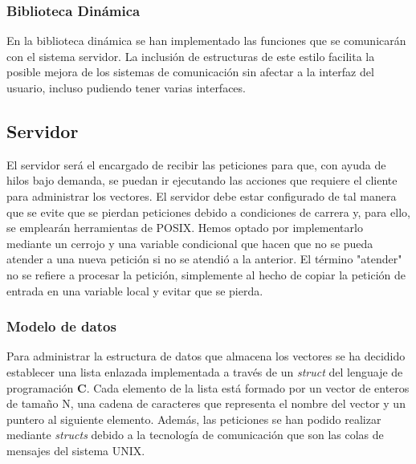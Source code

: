 \documentclass[10pt, spanish, pdftex]{template/UC3M_document}
\begin{document}
\subsubsection{Biblioteca Dinámica}
En la biblioteca dinámica se han implementado las funciones que se comunicarán con el sistema servidor. La inclusión de estructuras de este estilo facilita la posible mejora de los sistemas de comunicación sin afectar a la interfaz del usuario, incluso pudiendo tener varias interfaces.

\subsection{Servidor}
El servidor será el encargado de recibir las peticiones para que, con ayuda de hilos bajo demanda, se puedan ir ejecutando las acciones que requiere el cliente para administrar los vectores.
El servidor debe estar configurado de tal manera que se evite que se pierdan peticiones debido a condiciones de carrera y, para ello, se emplearán herramientas de POSIX. Hemos optado por implementarlo mediante un cerrojo y una variable condicional que hacen que no se pueda atender a una nueva petición si no se atendió a la anterior. El término "atender" no se refiere a procesar la petición, simplemente al hecho de copiar la petición de entrada en una variable local y evitar que se pierda.



\subsubsection{Modelo de datos}
Para administrar la estructura de datos que almacena los vectores se ha decidido establecer una lista enlazada implementada a través de un \textit{struct} del lenguaje de programación \textbf{C}. Cada elemento de la lista está formado por un vector de enteros de tamaño N, una cadena de caracteres que representa el nombre del vector y un puntero al siguiente elemento.
Además, las peticiones se han podido realizar mediante \textit{structs} debido a la tecnología de comunicación que son las colas de mensajes del sistema UNIX.
\end{document}
